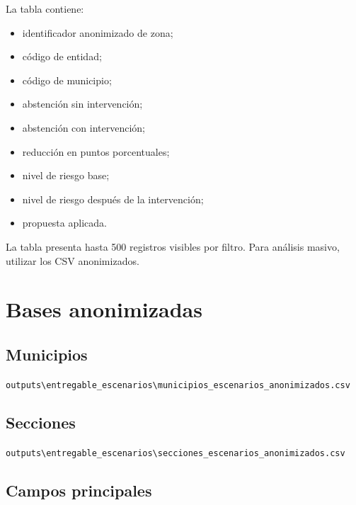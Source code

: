 \documentclass[11pt,a4paper]{article}
\newcommand{\ruta}[1]{\texttt{\small #1}}
\begin{document}
La tabla contiene:

\begin{itemize}
    \item identificador anonimizado de zona;
    \item código de entidad;
    \item código de municipio;
    \item abstención sin intervención;
    \item abstención con intervención;
    \item reducción en puntos porcentuales;
    \item nivel de riesgo base;
    \item nivel de riesgo después de la intervención;
    \item propuesta aplicada.
\end{itemize}

La tabla presenta hasta 500 registros visibles por filtro. Para análisis masivo, utilizar los CSV anonimizados.

\section{Bases anonimizadas}

\subsection{Municipios}

\ruta{outputs\textbackslash entregable\_escenarios\textbackslash municipios\_escenarios\_anonimizados.csv}

\subsection{Secciones}

\ruta{outputs\textbackslash entregable\_escenarios\textbackslash secciones\_escenarios\_anonimizados.csv}

\subsection{Campos principales}
\end{document}
